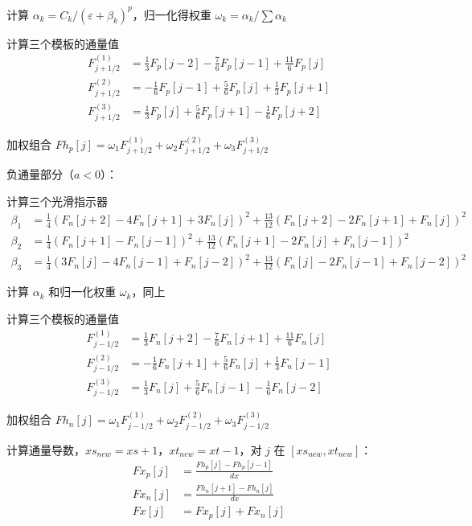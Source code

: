 \documentclass[12pt,a4paper]{article}
\begin{document}
计算 $\alpha_k = C_k / (\varepsilon + \beta_k)^p$，归一化得权重 $\omega_k = \alpha_k / \sum \alpha_k$

计算三个模板的通量值
\begin{align*}
    F^{(1)}_{j+1/2} &= \frac{1}{3}F_p[j-2] - \frac{7}{6}F_p[j-1] + \frac{11}{6}F_p[j] \\
    F^{(2)}_{j+1/2} &= -\frac{1}{6}F_p[j-1] + \frac{5}{6}F_p[j] + \frac{1}{3}F_p[j+1] \\
    F^{(3)}_{j+1/2} &= \frac{1}{3}F_p[j] + \frac{5}{6}F_p[j+1] - \frac{1}{6}F_p[j+2]
\end{align*}

加权组合 $Fh_p[j] = \omega_1 F^{(1)}_{j+1/2} + \omega_2 F^{(2)}_{j+1/2} + \omega_3 F^{(3)}_{j+1/2}$

负通量部分（$a<0$）：

计算三个光滑指示器
\begin{align*}
    \beta_1 &= \frac{1}{4}(F_n[j+2] - 4F_n[j+1] + 3F_n[j])^2 + \frac{13}{12}(F_n[j+2] - 2F_n[j+1] + F_n[j])^2 \\
    \beta_2 &= \frac{1}{4}(F_n[j+1] - F_n[j-1])^2 + \frac{13}{12}(F_n[j+1] - 2F_n[j] + F_n[j-1])^2 \\
    \beta_3 &= \frac{1}{4}(3F_n[j] - 4F_n[j-1] + F_n[j-2])^2 + \frac{13}{12}(F_n[j] - 2F_n[j-1] + F_n[j-2])^2
\end{align*}

计算 $\alpha_k$ 和归一化权重 $\omega_k$，同上

计算三个模板的通量值
\begin{align*}
    F^{(1)}_{j-1/2} &= \frac{1}{3}F_n[j+2] - \frac{7}{6}F_n[j+1] + \frac{11}{6}F_n[j] \\
    F^{(2)}_{j-1/2} &= -\frac{1}{6}F_n[j+1] + \frac{5}{6}F_n[j] + \frac{1}{3}F_n[j-1] \\
    F^{(3)}_{j-1/2} &= \frac{1}{3}F_n[j] + \frac{5}{6}F_n[j-1] - \frac{1}{6}F_n[j-2]
\end{align*}

加权组合 $Fh_n[j] = \omega_1 F^{(1)}_{j-1/2} + \omega_2 F^{(2)}_{j-1/2} + \omega_3 F^{(3)}_{j-1/2}$

计算通量导数，$xs_{new}=xs+1$，$xt_{new}=xt-1$，对 $j$ 在 $[xs_{new}, xt_{new}]$：
\begin{align*}
    Fx_p[j] &= \frac{Fh_p[j] - Fh_p[j-1]}{dx} \\
    Fx_n[j] &= \frac{Fh_n[j+1] - Fh_n[j]}{dx} \\
    Fx[j] &= Fx_p[j] + Fx_n[j]
\end{align*}
\end{document}
